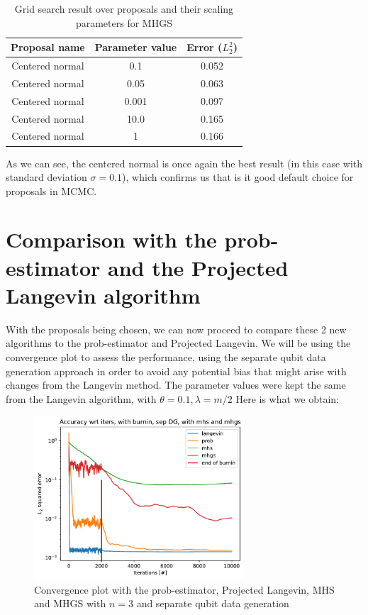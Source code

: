 \documentclass[12pt]{memoir}
\begin{document}
\begin{table}[H]

    \begin{center}
        \begin{tabular}{|c|c|c|}
            \hline
            Proposal name & Parameter value & Error ($L_2^2$)\\
            \hline\hline
            Centered normal& 0.1&0.052\\
            Centered normal& 0.05&0.063\\
            Centered normal& 0.001&0.097\\
            Centered normal& 10.0&0.165\\
            Centered normal& 1&0.166\\\hline
        \end{tabular}
\end{center}
\caption{Grid search result over proposals and their scaling parameters for MHGS}
\label{table:proposal-grid-search-mhgs}
\end{table}
As we can see, the centered normal is once again the best result (in this case with standard deviation $\sigma=0.1$), which confirms us that is it good default choice for proposals in MCMC.

\section{Comparison with the prob-estimator and the Projected Langevin algorithm}\label{section:mhs-mhgs-num-exp}
With the proposals being chosen, we can now proceed to compare these 2 new algorithms to the prob-estimator and Projected Langevin. We will be using the convergence plot to assess the performance, using the separate qubit data generation approach in order to avoid any potential bias that might arise with changes from the Langevin method. The parameter values were kept the same from the Langevin algorithm, with $\theta=0.1,\lambda=m/2$  Here is what we obtain:\medbreak

\begin{figure}[H]
    \centering
    \includegraphics[width=0.7\textwidth]{figures/experiments/mhs_mhgs/iters_acc_comp_iters_no_avg_sep_prob_pl_mhs_mhgs-1.png}
    \caption{Convergence plot with the prob-estimator, Projected Langevin, MHS and MHGS with $n=3$ and separate qubit data generation}
    \label{fig:mhs-mhgs-conv-plot}
\end{figure}
\end{document}
